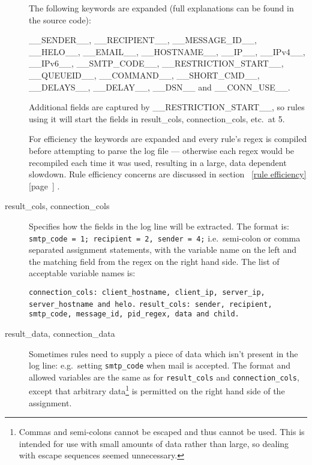 \documentclass[a4paper,12pt,draft]{article}
\newcommand{\refwithpage}[1]{%
    \empty{}\ref{#1} [page~\pageref{#1}]%
}
\begin{document}
\begin{description}
        The following keywords are expanded (full explanations can be found
        in the source code):

        \_\_SENDER\_\_, \_\_RECIPIENT\_\_, \_\_MESSAGE\_ID\_\_,
        \_\_HELO\_\_, \newline \_\_EMAIL\_\_, \_\_HOSTNAME\_\_, \_\_IP\_\_,
        \_\_IPv4\_\_, \_\_IPv6\_\_, \newline \_\_SMTP\_CODE\_\_,
        \_\_RESTRICTION\_START\_\_, \_\_QUEUEID\_\_, \newline
        \_\_COMMAND\_\_, \_\_SHORT\_CMD\_\_, \_\_DELAYS\_\_, \_\_DELAY\_\_,
        \_\_DSN\_\_ and \_\_CONN\_USE\_\_.

        Additional fields are captured by \_\_RESTRICTION\_START\_\_, so
        rules using it will start the fields in result\_cols,
        connection\_cols, etc.\ at 5.

        For efficiency the keywords are expanded and every rule's regex is
        compiled before attempting to parse the log file --- otherwise each
        regex would be recompiled each time it was used, resulting in a
        large, data dependent slowdown.  Rule efficiency concerns are
        discussed in section~\refwithpage{rule efficiency}.

    \item [result\_cols, connection\_cols] Specifies how the fields in the
        log line will be extracted.  The format is: \newline
        \texttt{smtp\_code = 1; recipient = 2, sender = 4;} \newline i.e.\
        semi-colon or comma separated assignment statements, with the
        variable name on the left and the matching field from the regex on
        the right hand side.  The list of acceptable variable names is:

        \texttt{connection\_cols: client\_hostname, client\_ip, server\_ip,
        \newline \hspace*{2em} server\_hostname and helo.\newline}
        \texttt{result\_cols: sender, recipient, smtp\_code, message\_id,
        \newline \hspace*{2em} pid\_regex, data and child.}

    \item [result\_data, connection\_data] Sometimes rules need to supply a
        piece of data which isn't present in the log line: e.g.\ setting
        \texttt{smtp\_code} when mail is accepted.  The format and allowed
        variables are the same as for \texttt{result\_cols} and
        \texttt{connection\_cols}, except that arbitrary
        data\footnote{Commas and semi-colons cannot be escaped and thus
        cannot be used.  This is intended for use with small amounts of
        data rather than large, so dealing with escape sequences seemed
        unnecessary.} is permitted on the right hand side of the
        assignment.


\end{description}
\end{document}
